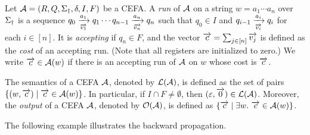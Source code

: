 {%
Let $\mathcal{A} = (R, Q, \Sigma_{\dag}, \delta, I, F)$ be a CEFA. 
A \emph{run} of $\mathcal{A}$ on a string $w = a_1 \cdots a_n$ over $\Sigma_{\dag}$ is a sequence $q_0 \xrightarrow[\overrightarrow{v_1}]{a_1} q_1 \cdots q_{n-1}\xrightarrow[\overrightarrow{v_n}]{a_n} q_n$ such that $q_0 \in I$ and $q_{i-1} \xrightarrow[\overrightarrow{v_i}]{a_i} q_i$ for each $i \in [n]$. 
%
It is \emph{accepting} if $q_n \in F$, and 
%
the vector $\overrightarrow{c}= \sum_{j \in [n]} \overrightarrow{v_j}$ is defined as the \emph{cost} of an accepting run. %
(Note that all registers are initialized to zero.) 
%
We write $\overrightarrow{c} \in \mathcal{A}(w)$ if there is an accepting run of $\mathcal{A}$ on $w$ whose cost is $\overrightarrow{c}$.  

The semantics of a CEFA $\mathcal{A}$, denoted by $\mathcal{L}(\mathcal{A})$, is defined as the set of pairs $\{(w, \overrightarrow{c}) \mid  \overrightarrow{c} \in \mathcal{A}(w)\}$.
%
In particular, if $I \cap F \neq \emptyset$, then $(\varepsilon, \overrightarrow{0}) \in \mathcal{L}(\mathcal{A})$. Moreover, the \emph{output} of a CEFA $\mathcal{A}$, denoted by $\mathcal{O}(\mathcal{A})$, is defined as $\{\overrightarrow{c} \mid  \exists w.\ \overrightarrow{c} \in \mathcal{A}(w)\}$.

The following example illustrates the backward propagation. 

}
